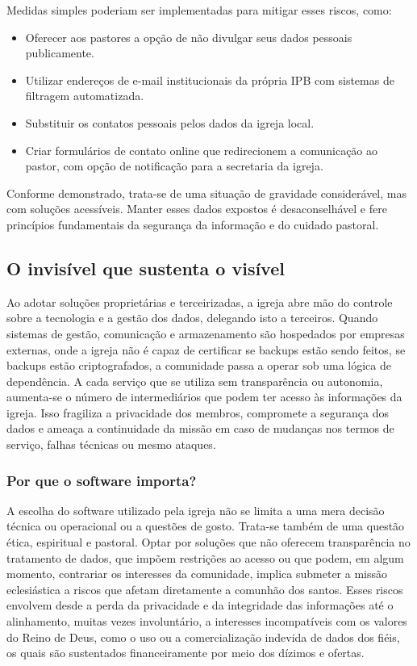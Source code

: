 Medidas simples poderiam ser implementadas para mitigar esses riscos, como:

\begin{itemize}
    \item Oferecer aos pastores a opção de não divulgar seus dados pessoais publicamente.
    \item Utilizar endereços de e-mail institucionais da própria IPB com sistemas de filtragem automatizada.
    \item Substituir os contatos pessoais pelos dados da igreja local.
    \item Criar formulários de contato online que redirecionem a comunicação ao pastor, com opção de notificação para a secretaria da igreja.
\end{itemize}

Conforme demonstrado, trata-se de uma situação de gravidade considerável, mas com soluções acessíveis. Manter esses dados expostos é desaconselhável e fere princípios fundamentais da segurança da informação e do cuidado pastoral.


\subsection{O invisível que sustenta o visível}

Ao adotar soluções proprietárias e terceirizadas, a igreja abre mão do controle sobre a tecnologia e a gestão dos dados, delegando isto a terceiros. Quando sistemas de gestão, comunicação e armazenamento são hospedados por empresas externas, onde a igreja não é capaz de certificar se backups estão sendo feitos, se backups estão criptografados, a comunidade passa a operar sob uma lógica de dependência. A cada serviço que se utiliza sem transparência ou autonomia, aumenta-se o número de intermediários que podem ter acesso às informações da igreja. Isso fragiliza a privacidade dos membros, compromete a segurança dos dados e ameaça a continuidade da missão em caso de mudanças nos termos de serviço, falhas técnicas ou mesmo ataques.

\subsubsection{Por que o software importa?}

A escolha do software utilizado pela igreja não se limita a uma mera decisão técnica ou operacional ou a questões de gosto. Trata-se também de uma questão ética, espiritual e pastoral. Optar por soluções que não oferecem transparência no tratamento de dados, que impõem restrições ao acesso ou que podem, em algum momento, contrariar os interesses da comunidade, implica submeter a missão eclesiástica a riscos que afetam diretamente a comunhão dos santos. Esses riscos envolvem desde a perda da privacidade e da integridade das informações até o alinhamento, muitas vezes involuntário, a interesses incompatíveis com os valores do Reino de Deus, como o uso ou a comercialização indevida de dados dos fiéis, os quais são sustentados financeiramente por meio dos dízimos e ofertas.

